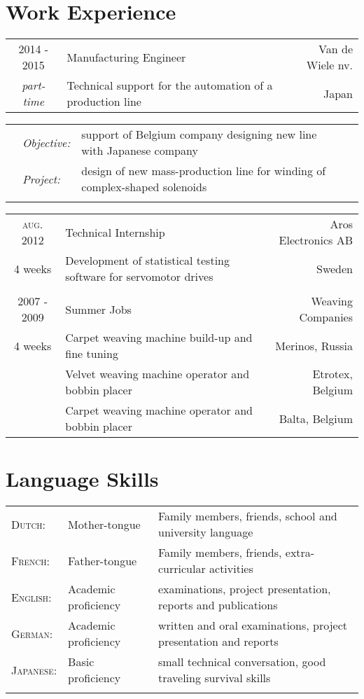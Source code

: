 \documentclass[a4paper,10pt]{article}
\begin{document}
\section{Work Experience}
\begin{tabularx}{\textwidth}{cXr}
\textsc{2014 - 2015}	& Manufacturing Engineer & Van de Wiele nv. \\
\textit{part-time}		& Technical support for the automation of a production line & Japan \\
\end{tabularx}
\begin{tabularx}{\textwidth}{clXr}
\hspace{55pt} & \textit{Objective:} & 
support of Belgium company designing new line with Japanese company \\
\hspace{55pt} & \textit{Project:} & 
design of new mass-production line for winding of complex-shaped solenoids \\
& & \\
\end{tabularx}
\begin{tabularx}{\textwidth}{cXr}
\textsc{aug. 2012}	 	& Technical Internship & Aros Electronics AB \\
4 weeks					& Development of statistical testing software for servomotor drives & Sweden \\
& & \\
\textsc{2007 - 2009} 	& Summer Jobs & Weaving Companies  \\
4 weeks 				& Carpet weaving machine build-up and fine tuning & Merinos, Russia \\
 						& Velvet weaving machine operator and bobbin placer & Etrotex, Belgium \\	 	
 						& Carpet weaving machine operator and bobbin placer & Balta, Belgium \\
\end{tabularx}

\section{Language Skills}
\begin{tabularx}{500pt}{lll}
\textsc{Dutch:} & Mother-tongue & 
Family members, friends, school and university language \\
\textsc{French:} & Father-tongue & 
Family members, friends, extra-curricular activities \\
\textsc{English:} & Academic proficiency & 
examinations, project presentation, reports and publications \\
\textsc{German:} & Academic proficiency & 
written and oral examinations, project presentation and reports \\
\textsc{Japanese:} & Basic proficiency & 
small technical conversation, good traveling survival skills \\
& & \\
\end{tabularx}
\end{document}
